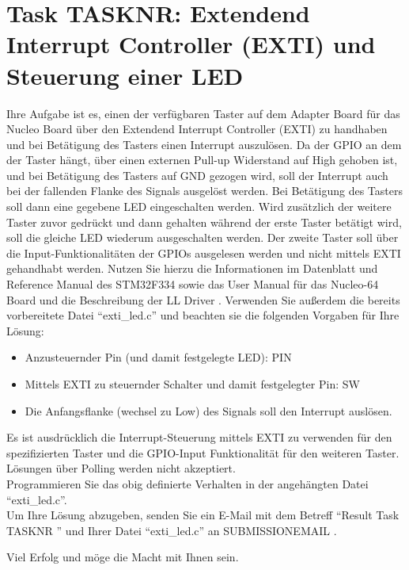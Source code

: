 \documentclass[a4paper,12pt]{article}
\begin{document}
\pagestyle{empty}
\setlength{\parindent}{0em}
\section*{Task {{TASKNR}}: Extendend Interrupt Controller (EXTI) und Steuerung einer LED}

Ihre Aufgabe ist es, einen der verfügbaren Taster auf dem Adapter Board für das Nucleo Board über den Extendend Interrupt Controller (EXTI) zu handhaben und bei Betätigung des Tasters einen Interrupt auszulösen. Da der GPIO an dem der Taster hängt, über einen externen Pull-up Widerstand auf High gehoben ist, und bei Betätigung des Tasters auf GND gezogen wird, soll der Interrupt auch bei der fallenden Flanke des Signals ausgelöst werden. Bei Betätigung des Tasters soll dann eine gegebene LED eingeschalten werden. Wird zusätzlich der weitere Taster zuvor gedrückt und dann gehalten während der erste Taster betätigt wird, soll die gleiche LED wiederum ausgeschalten werden. Der zweite Taster soll über die Input-Funktionalitäten der GPIOs ausgelesen werden und nicht mittels EXTI gehandhabt werden. Nutzen Sie hierzu die Informationen im Datenblatt \cite{data_sheet} und Reference Manual \cite{ref_manual} des STM32F334 sowie das User Manual für das Nucleo-64 Board \cite{nucleo_manual} und die Beschreibung der LL Driver \cite{driver_manual}. Verwenden Sie außerdem die bereits vorbereitete Datei \enquote{exti\_led.c} und beachten sie die folgenden Vorgaben für Ihre Lösung:

\begin{itemize}
\item Anzusteuernder Pin (und damit festgelegte LED): {{PIN}}
\item Mittels EXTI zu steuernder Schalter und damit festgelegter Pin: {{SW}}
\item Die Anfangsflanke (wechsel zu Low) des Signals soll den Interrupt auslösen.
\end{itemize}
\vspace{0.3cm}

Es ist ausdrücklich die Interrupt-Steuerung mittels EXTI zu verwenden für den spezifizierten Taster und die GPIO-Input Funktionalität für den weiteren Taster. Lösungen über Polling werden nicht akzeptiert.
\\

Programmieren Sie das obig definierte Verhalten in der angeh\"angten Datei \enquote{exti\_led.c}.
\\

Um Ihre L\"osung abzugeben, senden Sie ein E-Mail mit dem Betreff \enquote{Result Task {{ TASKNR }}} und Ihrer Datei \enquote{exti\_led.c}  an {{ SUBMISSIONEMAIL }}.

\vspace{0.7cm}

Viel Erfolg und m\"oge die Macht mit Ihnen sein.

\newpage
\printbibliography[heading=bibintoc]
\end{document}
